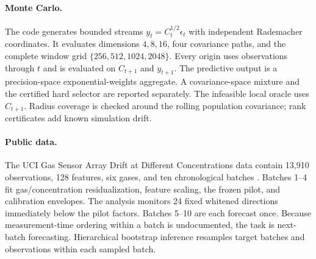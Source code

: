 \paragraph{Monte Carlo.}
The code generates bounded streams $y_t=C_t^{1/2}\epsilon_t$ with independent Rademacher coordinates.  It evaluates dimensions $4,8,16$, four covariance paths, and the complete window grid $\{256,512,1024,2048\}$.  Every origin uses observations through $t$ and is evaluated on $C_{t+1}$ and $y_{t+1}$.  The predictive output is a precision-space exponential-weights aggregate.  A covariance-space mixture and the certified hard selector are reported separately.  The infeasible local oracle uses $C_{t+1}$.  Radius coverage is checked around the rolling population covariance; rank certificates add known simulation drift.

\paragraph{Public data.}
The UCI Gas Sensor Array Drift at Different Concentrations data contain 13,910 observations, 128 features, six gases, and ten chronological batches \citep{vergara2013uci,vergara2012drift,fonollosa2015dataset}.  Batches 1--4 fit gas/concentration residualization, feature scaling, the frozen pilot, and calibration envelopes.  The analysis monitors 24 fixed whitened directions immediately below the pilot factors.  Batches 5--10 are each forecast once.  Because measurement-time ordering within a batch is undocumented, the task is next-batch forecasting.  Hierarchical bootstrap inference resamples target batches and observations within each sampled batch.
